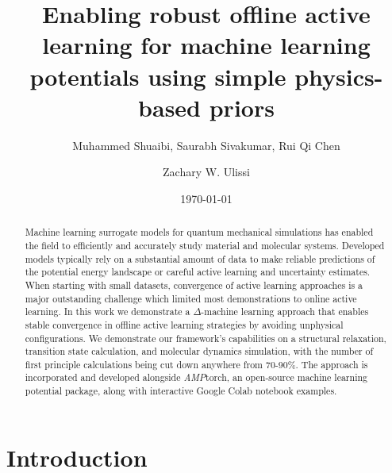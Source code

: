 \documentclass[%
 reprint,
 amsmath,amssymb,
 aps,
]{revtex4-2}
\begin{document}
\title{Enabling robust offline active learning for machine learning potentials using simple physics-based priors}

\author{Muhammed Shuaibi, Saurabh Sivakumar, Rui Qi Chen}
\author{Zachary W. Ulissi}%
%

\date{\today}

\begin{abstract}
Machine learning surrogate models for quantum mechanical simulations has enabled the field to efficiently and accurately study material and molecular systems. Developed models typically rely on a substantial amount of data to make reliable predictions of the potential energy landscape or careful active learning and uncertainty estimates. When starting with small datasets, convergence of active learning approaches is a major outstanding challenge which limited most demonstrations to online active learning. In this work we demonstrate a $\Delta$-machine learning approach that enables stable convergence in offline active learning strategies by avoiding unphysical configurations.  We demonstrate our framework's capabilities on a structural relaxation, transition state calculation, and molecular dynamics simulation,  with the number of first principle calculations being cut down anywhere from 70-90\%.  The approach is incorporated and developed alongside \textit{AMP}torch, an open-source machine learning potential package, along with interactive Google Colab notebook examples.  
\end{abstract}

\maketitle

\section{Introduction}
\end{document}
